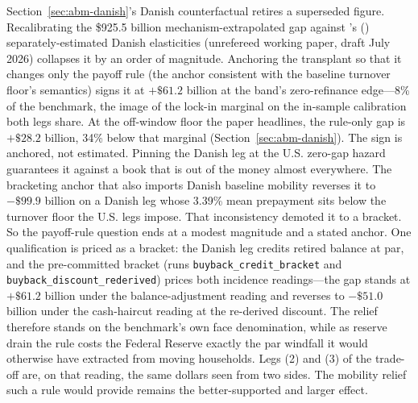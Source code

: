 \documentclass[12pt]{article}
\newcommand{\citepos}[1]{\citeauthor{#1}'s (\citeyear{#1})}
\begin{document}
Section~\ref{sec:abm-danish}'s Danish counterfactual retires a superseded figure. Recalibrating the \$925.5 billion mechanism-extrapolated gap against \citepos{berger2026} separately-estimated Danish elasticities (unrefereed working paper, draft July 2026) collapses it by an order of magnitude. Anchoring the transplant so that it changes only the payoff rule (the anchor consistent with the baseline turnover floor's semantics) signs it at $+\$61.2$ billion at the band's zero-refinance edge---8\% of the benchmark, the image of the lock-in marginal on the in-sample calibration both legs share. At the off-window floor the paper headlines, the rule-only gap is $+\$28.2$ billion, 34\% below that marginal (Section~\ref{sec:abm-danish}). The sign is anchored, not estimated. Pinning the Danish leg at the U.S. zero-gap hazard guarantees it against a book that is out of the money almost everywhere. The bracketing anchor that also imports Danish baseline mobility reverses it to $-\$99.9$ billion on a Danish leg whose 3.39\% mean prepayment sits below the turnover floor the U.S. legs impose. That inconsistency demoted it to a bracket. So the payoff-rule question ends at a modest magnitude and a stated anchor. One qualification is priced as a bracket: the Danish leg credits retired balance at par, and the pre-committed bracket (runs \texttt{buyback\_credit\_bracket} and \texttt{buyback\_discount\_rederived}) prices both incidence readings---the gap stands at $+\$61.2$ billion under the balance-adjustment reading and reverses to $-\$51.0$ billion under the cash-haircut reading at the re-derived discount. The relief therefore stands on the benchmark's own face denomination, while as reserve drain the rule costs the Federal Reserve exactly the par windfall it would otherwise have extracted from moving households. Legs (2) and (3) of the trade-off are, on that reading, the same dollars seen from two sides. The mobility relief such a rule would provide remains the better-supported and larger effect.
\end{document}
